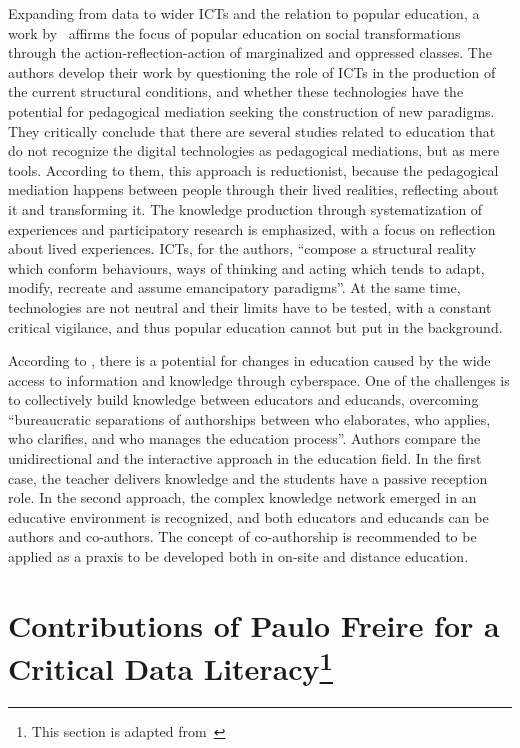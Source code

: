 Expanding from data to wider ICTs and the relation to popular education, a work by~ affirms the focus of popular education on social transformations through the action-reflection-action of marginalized and oppressed classes. The authors develop their work by questioning the role of ICTs in the production of the current structural conditions, and whether these technologies have the potential for pedagogical mediation seeking the construction of new paradigms. They critically conclude that there are several studies related to education that do not recognize the digital technologies as pedagogical mediations, but as mere tools. According to them, this approach is reductionist, because the pedagogical mediation happens between people through their lived realities, reflecting about it and transforming it. The knowledge production through systematization of experiences and participatory research is emphasized, with a focus on reflection about lived experiences. ICTs, for the authors, “compose a structural reality which conform behaviours, ways of thinking and acting which tends to adapt, modify, recreate and assume emancipatory paradigms”. At the same time, technologies are not neutral and their limits have to be tested, with a constant critical vigilance, and thus popular education cannot but put in the background.

According to , there is a potential for changes in education caused by the wide access to information and knowledge through cyberspace. One of the challenges is to collectively build knowledge between educators and educands, overcoming “bureaucratic separations of authorships between who elaborates, who applies, who clarifies, and who manages the education process”. Authors compare the unidirectional and the interactive approach in the education field. In the first case, the teacher delivers knowledge and the students have a passive reception role. In the second approach, the complex knowledge network emerged in an educative environment is recognized, and both educators and educands can be authors and co-authors. The concept of co-authorship is recommended to be applied as a praxis to be developed both in on-site and distance education.

\section[Contributions of Paulo Freire for a Critical Data Literacy]{Contributions of Paulo Freire for a Critical Data Literacy\footnote{This section is adapted from~}}
\label{dl_paulofreire} 

